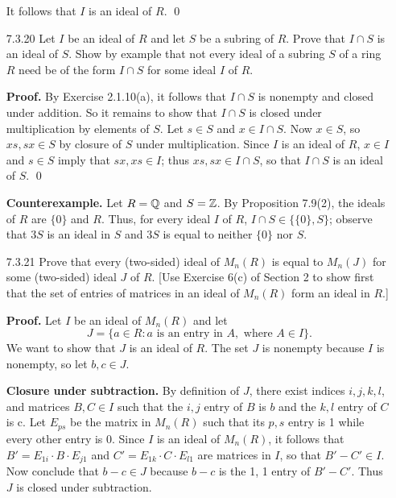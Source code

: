 \begin{enumerate}
      It follows that $I$ is an ideal of $R$. \qed
   \item[7.3.20]  Let $I$ be an ideal of $R$ and let $S$ be a subring of $R$.
                  Prove that $I \cap S$ is an ideal of $S$. Show by example that
                  not every ideal of a subring $S$ of a ring $R$ need be of the
                  form $I \cap S$ for some ideal $I$ of $R$.

      \textbf{Proof.} By Exercise 2.1.10(a), it follows that $I \cap S$ is
      nonempty and closed under addition. So it remains to show that $I \cap S$
      is closed under multiplication by elements of $S$. Let $s \in S$ and
      $x \in I \cap S$. Now $x \in S$, so $xs, sx \in S$ by closure of $S$ under
      multiplication. Since $I$ is an ideal of $R$, $x \in I$ and $s \in S$ 
      imply that $sx, xs \in I$; thus $xs, sx \in I \cap S$, so that $I \cap S$ 
      is an ideal of $S$. \qed

      \textbf{Counterexample.} Let $R = \mathbb{Q}$ and $S = \mathbb{Z}$. By Proposition 7.9(2),
      the ideals of $R$ are $\{0\}$ and $R$. Thus, for every ideal $I$ of $R$,
      $I \cap S \in \{\{0\}, S\}$; observe that $3S$ is an ideal in $S$ and
      $3S$ is equal to neither $\{0\}$ nor $S$.
      
   \item[7.3.21]  Prove that every (two-sided) ideal of $M_n(R)$ is equal to
                  $M_n(J)$ for some (two-sided) ideal $J$ of $R$. [Use Exercise
                  6(c) of Section 2 to show first that the set of entries of
                  matrices in an ideal of $M_n(R)$ form an ideal in $R$.]

      \textbf{Proof.} Let $I$ be an ideal of $M_n(R)$ and let
      $$J = \{a \in R : a \text{ is an entry in }A, \text{ where }A \in I\}.$$
      We want to show that $J$ is an ideal of $R$. The set $J$ is nonempty
      because $I$ is nonempty, so let $b, c \in J$.

      \textbf{Closure under subtraction.} By definition of $J$, there exist
      indices $i, j, k, l$, and matrices $B, C \in I$ such that the $i, j$
      entry of $B$ is $b$ and the $k, l$ entry of $C$ is c. Let $E_{ps}$ be the
      matrix in $M_n(R)$ such that its $p, s$ entry is 1 while every other entry 
      is 0. Since $I$ is an ideal of $M_n(R)$, it follows that
      $B' = E_{1i}\cdot B\cdot E_{j1}$ and $C' = E_{1k}\cdot C \cdot E_{l1}$
      are matrices in $I$, so that $B'-C' \in I$. Now conclude that $b-c \in J$
      because $b-c$ is the 1, 1 entry of $B' - C'$. Thus $J$ is closed under
      subtraction.


\end{enumerate}
